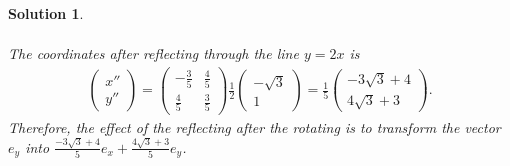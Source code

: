 \documentclass[UTF8,10pt,a4paper]{article}
\theoremstyle{Problem}
\theoremstyle{Solution}
\newtheorem*{sol}{Solution}
\begin{document}
\begin{sol}
\begin{enumerate}
\begin{align}
        \end{align}
        The coordinates after reflecting through the line $y=2x$ is
        \begin{align}
            \left(\begin{matrix}
                x''\\
                y''
            \end{matrix}\right)=\left(\begin{matrix}
                -\frac{3}{5}&\frac{4}{5}\\
                \frac{4}{5}&\frac{3}{5}
            \end{matrix}\right)\frac{1}{2}\left(\begin{matrix}
                -\sqrt{3}\\
                1
            \end{matrix}\right)=\frac{1}{5}\left(\begin{matrix}
                -3\sqrt{3}+4\\
                4\sqrt{3}+3
            \end{matrix}\right).
        \end{align}
        Therefore, the effect of the reflecting after the rotating is to transform the vector $e_y$ into $\frac{-3\sqrt{3}+4}{5}e_x+\frac{4\sqrt{3}+3}{5}e_y$.
    \end{enumerate}
\end{sol}
\end{document}
